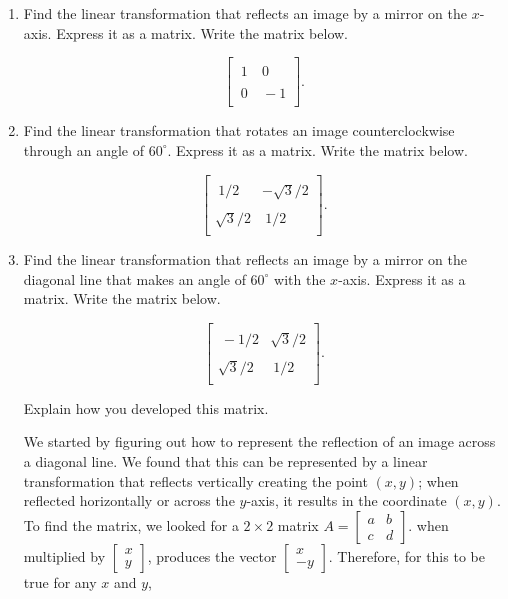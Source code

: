 \documentclass{ximera}
\begin{document}
\begin{enumerate}
    \item Find the linear transformation that reflects an image by a mirror on the $x$-axis.  Express it as a matrix.  Write the matrix below.

$$\left[{\begin{array}{cc}
\\
\ 1 & \ 0 \\
\\
\ 0 & \ -1 \\
\end{array}}\right].$$

\item Find the linear transformation that rotates an image counterclockwise through an angle of $60^{\circ}$.  Express it as a matrix.  Write the matrix below.

$$\left[{\begin{array}{cc}
\\
\ 1/2 & -\sqrt{3}/2 \\
\\
\sqrt{3}/2& \ 1/2 \\
\end{array}}\right].$$


\item Find the linear transformation that reflects an image by a mirror on the diagonal line that makes an angle of $60^{\circ}$ with the $x$-axis.  Express it as a matrix.  Write the matrix below.

$$\left[{\begin{array}{cc}
\\
\ -1/2 & \sqrt{3}/2 \\
\\
\sqrt{3}/2 & \ 1/2 \\
\end{array}}\right].$$

\vspace{8pt}


\noindent Explain how you developed this matrix.


We started by figuring out how to represent the reflection of an image across a diagonal line. We found that this can be represented by a  linear transformation that reflects vertically creating the point $(x,y)$; when reflected horizontally or across the $y$-axis, it results in the coordinate $(x,y)$. To find the matrix, we looked for a $2\times 2$ matrix
$A=\left[
\begin{array}{cc}
   a & b \\
   c  & d
\end{array}
\right].$ when multiplied by $ \left[ \begin{array}{cc}
     x\\
     y 
\end{array} \right] $, produces the vector  $ \left[ \begin{array}{cc}
     x\\
     -y 
\end{array} \right] $. 
Therefore, for this to be true for any $x$ and $y$,


\end{enumerate}
\end{document}
